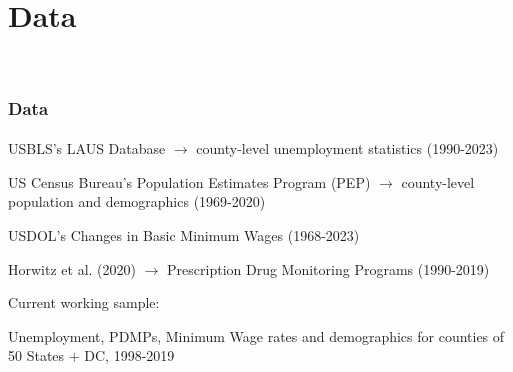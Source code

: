 

\section{Data}

\begin{transitionframe}

    \rmfamily %
    
    \begin{center}
    {\Huge \textbf{\textcolor{white}{Data}}}
    \end{center}
  
\end{transitionframe}

\begin{frame}

    \frametitle{Data} %
    \framesubtitle{}  %
    \rmfamily %

    \begin{wideitemize}
        \item \textcolor{fgre}{USBLS's LAUS Database} \(\to\) county-level unemployment statistics (1990-2023)
        \item \textcolor{fgre}{US Census Bureau's Population Estimates Program (PEP)} \(\to\) county-level population and demographics (1969-2020)
        \item \textcolor{fgre}{USDOL's Changes in Basic Minimum Wages} (1968-2023)
        \item \textcolor{fgre}{Horwitz et al. (2020)} \(\to\) Prescription Drug Monitoring Programs (1990-2019)
    \end{wideitemize}

    \vspace{9pt} 
    Current working sample:
    \vspace{9pt}
    
    \begin{wideitemize}
        \item Unemployment, PDMPs, Minimum Wage rates and demographics for counties of 50 States + DC, 1998-2019
    \end{wideitemize}

\end{frame}


